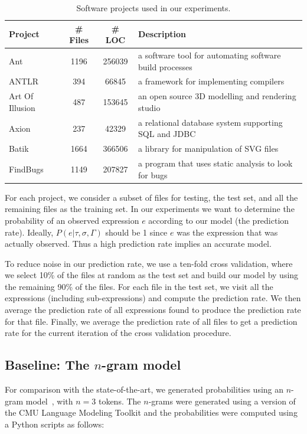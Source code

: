 \documentclass{article} %
\begin{document}
\setlength{\textfloatsep}{10pt}
\begin{table}[t]
\centering
\begin{tabular}{|l|c|c|l|}
\hline
\textbf{Project} & \textbf{\# Files} & \textbf{\# LOC} & \textbf{Description} \\
\hline
Ant & 1196 & 256039 & a software tool for automating software build processes \\
ANTLR & 394 & 66845 & a framework for implementing compilers \\
Art Of Illusion & 487 & 153645 & an open source 3D modelling and rendering studio \\
Axion & 237 & 42329 & a relational database system supporting SQL and JDBC \\
Batik & 1664 & 366506 & a library for manipulation of SVG files \\
FindBugs & 1149 & 207827 & a program that uses static analysis to look for bugs \\
\hline
\end{tabular}
\caption{Software projects used in our experiments.}
\label{tab:projects}
\end{table}
For each project, we consider a subset of files for testing, the test set, and all the remaining files as the training set.
In our experiments we want to determine the probability of an observed expression $e$ according to our model (the prediction rate). Ideally, $P(e| \tau, \sigma, \Gamma)$ should be 1 since $e$ was the expression that was actually observed. Thus a high prediction rate implies an accurate model.

To reduce noise in our prediction rate, we use a ten-fold cross validation, where we select 10\% of the files at random as the test set and build our model by using the remaining 90\% of the files. For each file in the test set, we visit all the expressions (including sub-expressions) and compute the prediction rate. We then average the prediction rate of all expressions found to produce the prediction rate for that file. Finally, we average the prediction rate of all files to get a prediction rate for the current iteration of the cross validation procedure.

\subsection*{Baseline: The $n$-gram model}
For comparison with the state-of-the-art, we generated probabilities using an $n$-gram model~\cite{Hindle:2012:NS:2337223.2337322}, with $n = 3$ tokens. The $n$-grams were generated using a version of the CMU Language Modeling Toolkit and the probabilities were computed using a Python scripts as follows:
\end{document}
